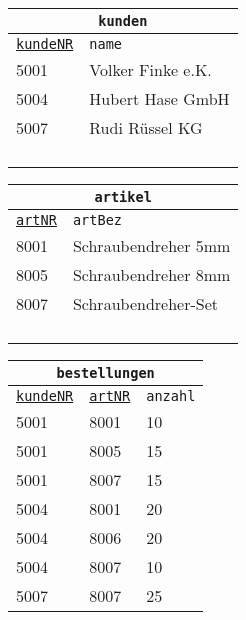 \begin{Answer}[ref=Normal2]
	\begin{minipage}{\textwidth}
		\begin{minipage}{0.35\textwidth}
			\begin{tabular}{ll}
				\multicolumn{2}{c}{\lstinline!kunden!}\\
				\hline
				\underline{\lstinline!kundeNR!}&\lstinline!name!\\
				\hline
				5001&Volker Finke e.K.\\
				5004&Hubert Hase GmbH\\
				5007&Rudi Rüssel KG\\
				\vphantom{0}&\\
				\vphantom{0}&\\
				\vphantom{0}&\\
				\vphantom{0}&\\
			\end{tabular}
		\end{minipage}
		\begin{minipage}{0.35\textwidth}
			\begin{tabular}{ll}
				\multicolumn{2}{c}{\lstinline!artikel!}\\
				\hline
				\underline{\lstinline!artNR!}&\lstinline!artBez!\\
				\hline
				8001&Schraubendreher 5mm\\
				8005&Schraubendreher 8mm\\
				8007&Schraubendreher-Set\\
				\vphantom{0}&\\
				\vphantom{0}&\\
				\vphantom{0}&\\
				\vphantom{0}&\\
			\end{tabular}
		\end{minipage}
		\begin{minipage}{0.2\textwidth}
			\begin{tabular}{lll}
				\multicolumn{3}{c}{\lstinline!bestellungen!}\\
				\hline
				\underline{\lstinline!kundeNR!}&\underline{\lstinline!artNR!}&\lstinline!anzahl!\\
				\hline
				5001&8001&10\\
				5001&8005&15\\
				5001&8007&15\\
				5004&8001&20\\
				5004&8006&20\\
				5004&8007&10\\
				5007&8007&25\\
			\end{tabular}
		\end{minipage}
	\end{minipage}
\end{Answer}